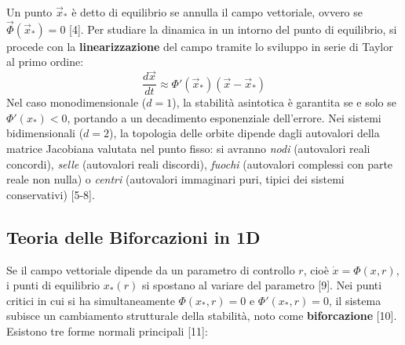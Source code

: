 \documentclass[12pt,a4paper]{article}
\begin{document}
Un punto $\vec{x}_*$ è detto di equilibrio se annulla il campo vettoriale, ovvero se $\vec{\Phi}(\vec{x}_*) = 0$ [4]. Per studiare la dinamica in un intorno del punto di equilibrio, si procede con la \textbf{linearizzazione} del campo tramite lo sviluppo in serie di Taylor al primo ordine:
\begin{equation}
\frac{d\vec{x}}{dt} \approx \Phi'(\vec{x}_*)(\vec{x} - \vec{x}_*)
\end{equation}
Nel caso monodimensionale ($d=1$), la stabilità asintotica è garantita se e solo se $\Phi'(x_*) < 0$, portando a un decadimento esponenziale dell'errore. Nei sistemi bidimensionali ($d=2$), la topologia delle orbite dipende dagli autovalori della matrice Jacobiana valutata nel punto fisso: si avranno \textit{nodi} (autovalori reali concordi), \textit{selle} (autovalori reali discordi), \textit{fuochi} (autovalori complessi con parte reale non nulla) o \textit{centri} (autovalori immaginari puri, tipici dei sistemi conservativi) [5-8].

\subsection{Teoria delle Biforcazioni in 1D}
Se il campo vettoriale dipende da un parametro di controllo $r$, cioè $\dot{x} = \Phi(x, r)$, i punti di equilibrio $x_*(r)$ si spostano al variare del parametro [9]. Nei punti critici in cui si ha simultaneamente $\Phi(x_*, r) = 0$ e $\Phi'(x_*, r) = 0$, il sistema subisce un cambiamento strutturale della stabilità, noto come \textbf{biforcazione} [10]. Esistono tre forme normali principali [11]:
\end{document}
